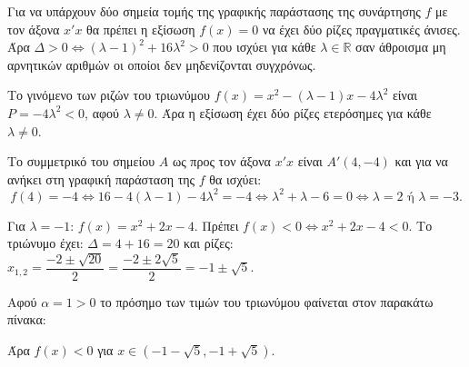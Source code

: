 
\begin{alist}
\item Για να υπάρχουν δύο σημεία τομής της γραφικής παράστασης της συνάρτησης $f$ με τον άξονα $x'x$ θα πρέπει η εξίσωση $f(x) = 0$ να έχει δύο ρίζες πραγματικές άνισες.
Άρα $\Delta > 0 \Leftrightarrow (\lambda - 1)^2 + 16\lambda^2 > 0$ που ισχύει για κάθε $\lambda \in \mathbb{R}$ σαν άθροισμα μη αρνητικών αριθμών οι οποίοι δεν μηδενίζονται συγχρόνως.

\item Το γινόμενο των ριζών του τριωνύμου $f(x) = x^2 - (\lambda - 1)x - 4\lambda^2$ είναι $P = -4\lambda^2 < 0$,
αφού $\lambda \ne 0$.
Άρα η εξίσωση έχει δύο ρίζες ετερόσημες για κάθε $\lambda \ne 0$.

\item Το συμμετρικό του σημείου $A$ ως προς τον άξονα $x'x$ είναι $A'(4, -4)$ και για να ανήκει στη γραφική παράσταση της $f$ θα ισχύει:
\[f(4) = -4 \Leftrightarrow 16 - 4(\lambda - 1) - 4\lambda^2 = -4 \Leftrightarrow \lambda^2 + \lambda - 6 = 0 \Leftrightarrow \lambda = 2 \text{ ή } \lambda = -3.\]

\item Για $\lambda = -1$:
$f(x) = x^2 + 2x - 4$.
Πρέπει $f(x) < 0 \Leftrightarrow x^2 + 2x - 4 < 0$.
Το τριώνυμο έχει: $\Delta = 4 + 16 = 20$
και ρίζες: $x_{1,2} = \dfrac{-2 \pm \sqrt{20}}{2} = \dfrac{-2 \pm 2\sqrt{5}}{2} = -1 \pm \sqrt{5}$.

Αφού $\alpha = 1 > 0$ το πρόσημο των τιμών του τριωνύμου φαίνεται στον παρακάτω πίνακα:
\begin{center}
\end{center}

Άρα $f(x) < 0$ για $x \in (-1 - \sqrt{5}, -1 + \sqrt{5})$.
\end{alist}

